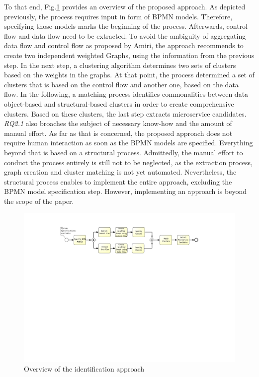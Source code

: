 \endgroup
\vspace{0.5cm}



\noindent
To that end, Fig.\ref{fig:thesisProcess} provides an overview of the proposed approach. As depicted previously, the process requires input in form of BPMN models. Therefore, specifying those models marks the beginning of the process. Afterwards, control flow and data flow need to be extracted. To avoid the ambiguity of aggregating data flow and control flow as proposed by Amiri, the approach recommends to create two independent weighted Graphs, using the information from the previous step. In the next step, a clustering algorithm determines two sets of clusters based on the weights in the graphs. At that point, the process determined a set of clusters that is based on the control flow and another one, based on the data flow. In the following, a matching process identifies commonalities between data object-based and structural-based clusters in order to create comprehensive clusters. Based on these clusters, the last step extracts microservice candidates. \\
\textit{RQ2.1} also broaches the subject of necessary know-how and the amount of manual effort. As far as that is concerned, the proposed approach does not require human interaction as soon as the BPMN models are specified. Everything beyond that is based on a structural process.
Admittedly, the manual effort to conduct the process entirely is still not to be neglected, as the extraction process, graph creation and cluster matching is not yet automated. Nevertheless, the structural process enables to implement the entire approach, excluding the BPMN model specification step. However, implementing an approach is beyond the scope of the paper.




 
\begin{figure}[h!]
	\includegraphics[width=\textwidth, trim={7.5cm 15.3cm 5.0cm 1.5cm}]{img/ThesisProcess.pdf}
	\caption{Overview of the identification approach}
	\label{fig:thesisProcess}
\end{figure}






